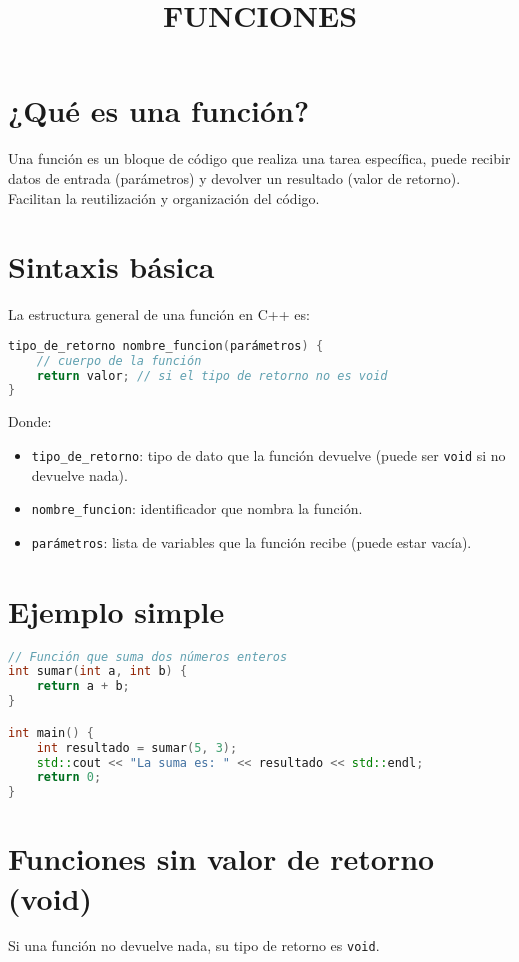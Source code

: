 \documentclass[a4paper]{article}
\begin{document}
\newpage
\title{FUNCIONES}
\section{¿Qué es una función?}

Una función es un bloque de código que realiza una tarea específica, puede recibir datos de entrada (parámetros) y devolver un resultado (valor de retorno). Facilitan la reutilización y organización del código.

\section{Sintaxis básica}

La estructura general de una función en C++ es:

\begin{lstlisting}[language=C++]
tipo_de_retorno nombre_funcion(parámetros) {
    // cuerpo de la función
    return valor; // si el tipo de retorno no es void
}
\end{lstlisting}

Donde:
\begin{itemize}
    \item \texttt{tipo\_de\_retorno}: tipo de dato que la función devuelve (puede ser \texttt{void} si no devuelve nada).
    \item \texttt{nombre\_funcion}: identificador que nombra la función.
    \item \texttt{parámetros}: lista de variables que la función recibe (puede estar vacía).
\end{itemize}

\section{Ejemplo simple}

\begin{lstlisting}[language=C++]
// Función que suma dos números enteros
int sumar(int a, int b) {
    return a + b;
}

int main() {
    int resultado = sumar(5, 3);
    std::cout << "La suma es: " << resultado << std::endl;
    return 0;
}
\end{lstlisting}

\section{Funciones sin valor de retorno (void)}

Si una función no devuelve nada, su tipo de retorno es \texttt{void}.
\end{document}
